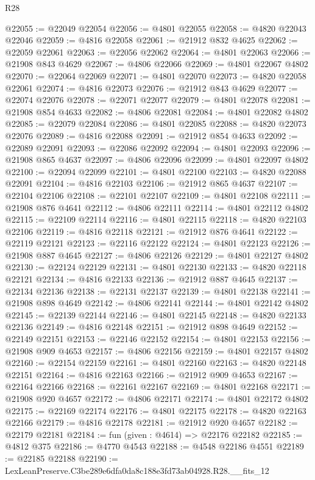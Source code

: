 \begin{lexlean}{R28}
\begin{coremodule}
@22055 := @22049 @22054
@22056 := @4801 @22055
@22058 := @4820 @22043 @22046
@22059 := @4816 @22058
@22061 := @21912 @832 @4625
@22062 := @22059 @22061
@22063 := @22056 @22062
@22064 := @4801 @22063
@22066 := @21908 @843 @4629
@22067 := @4806 @22066
@22069 := @4801 @22067 @4802
@22070 := @22064 @22069
@22071 := @4801 @22070
@22073 := @4820 @22058 @22061
@22074 := @4816 @22073
@22076 := @21912 @843 @4629
@22077 := @22074 @22076
@22078 := @22071 @22077
@22079 := @4801 @22078
@22081 := @21908 @854 @4633
@22082 := @4806 @22081
@22084 := @4801 @22082 @4802
@22085 := @22079 @22084
@22086 := @4801 @22085
@22088 := @4820 @22073 @22076
@22089 := @4816 @22088
@22091 := @21912 @854 @4633
@22092 := @22089 @22091
@22093 := @22086 @22092
@22094 := @4801 @22093
@22096 := @21908 @865 @4637
@22097 := @4806 @22096
@22099 := @4801 @22097 @4802
@22100 := @22094 @22099
@22101 := @4801 @22100
@22103 := @4820 @22088 @22091
@22104 := @4816 @22103
@22106 := @21912 @865 @4637
@22107 := @22104 @22106
@22108 := @22101 @22107
@22109 := @4801 @22108
@22111 := @21908 @876 @4641
@22112 := @4806 @22111
@22114 := @4801 @22112 @4802
@22115 := @22109 @22114
@22116 := @4801 @22115
@22118 := @4820 @22103 @22106
@22119 := @4816 @22118
@22121 := @21912 @876 @4641
@22122 := @22119 @22121
@22123 := @22116 @22122
@22124 := @4801 @22123
@22126 := @21908 @887 @4645
@22127 := @4806 @22126
@22129 := @4801 @22127 @4802
@22130 := @22124 @22129
@22131 := @4801 @22130
@22133 := @4820 @22118 @22121
@22134 := @4816 @22133
@22136 := @21912 @887 @4645
@22137 := @22134 @22136
@22138 := @22131 @22137
@22139 := @4801 @22138
@22141 := @21908 @898 @4649
@22142 := @4806 @22141
@22144 := @4801 @22142 @4802
@22145 := @22139 @22144
@22146 := @4801 @22145
@22148 := @4820 @22133 @22136
@22149 := @4816 @22148
@22151 := @21912 @898 @4649
@22152 := @22149 @22151
@22153 := @22146 @22152
@22154 := @4801 @22153
@22156 := @21908 @909 @4653
@22157 := @4806 @22156
@22159 := @4801 @22157 @4802
@22160 := @22154 @22159
@22161 := @4801 @22160
@22163 := @4820 @22148 @22151
@22164 := @4816 @22163
@22166 := @21912 @909 @4653
@22167 := @22164 @22166
@22168 := @22161 @22167
@22169 := @4801 @22168
@22171 := @21908 @920 @4657
@22172 := @4806 @22171
@22174 := @4801 @22172 @4802
@22175 := @22169 @22174
@22176 := @4801 @22175
@22178 := @4820 @22163 @22166
@22179 := @4816 @22178
@22181 := @21912 @920 @4657
@22182 := @22179 @22181
@22184 := fun (given : @4614) => @22176 @22182
@22185 := @4812 @375
@22186 := @4770 @4543
@22188 := @4548 @22186 @4551
@22189 := @22185 @22188
@22190 := LexLeanPreserve.C3be289e6dfa0da8c188e3fd73ab04928.R28.__fits_12

\end{coremodule}
\end{lexlean}
